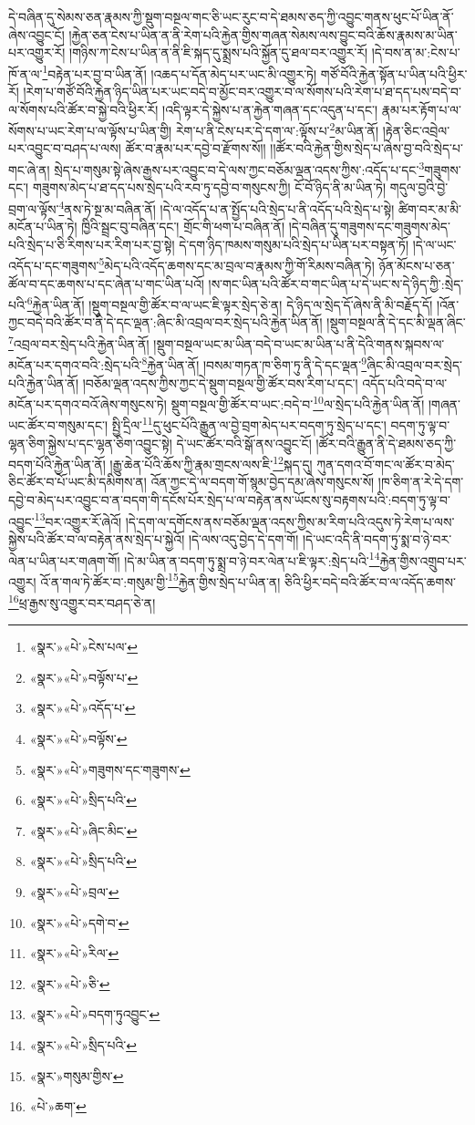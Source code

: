 དེ་བཞིན་དུ་སེམས་ཅན་རྣམས་ཀྱི་སྡུག་བསྔལ་གང་ཅི་ཡང་རུང་བ་དེ་ཐམས་ཅད་ཀྱི་འབྱུང་གནས་ཕུང་པོ་ཡིན་ནོ་ཞེས་འབྱུང་ངོ། །རྐྱེན་ཅན་ངེས་པ་ཡིན་ན་ནི་རེག་པའི་རྐྱེན་གྱིས་གཞན་སེམས་ལས་བྱུང་བའི་ཆོས་རྣམས་མ་ཡིན་པར་འགྱུར་རོ། །གཉིས་ཀ་ངེས་པ་ཡིན་ན་ནི་ཇི་སྐད་དུ་སྨྲས་པའི་སྐྱོན་དུ་ཐལ་བར་འགྱུར་རོ། །དེ་བས་ན་མ་:ངེས་པ་ཁོ་ན་ལ་\footnote{«སྣར་»«པེ་»ངེས་པལ་}བརྟེན་པར་བྱ་བ་ཡིན་ནོ། །འཆད་པ་དོན་མེད་པར་ཡང་མི་འགྱུར་ཏེ། གཙོ་བོའི་རྐྱེན་སྟོན་པ་ཡིན་པའི་ཕྱིར་རོ། །རེག་པ་གཙོ་བོའི་རྐྱེན་ཉིད་ཡིན་པར་ཡང་བདེ་བ་མྱོང་བར་འགྱུར་བ་ལ་སོགས་པའི་རེག་པ་ཐ་དད་པས་བདེ་བ་ལ་སོགས་པའི་ཚོར་བ་སྐྱེ་བའི་ཕྱིར་རོ། །འདི་ལྟར་དེ་སྐྱེས་པ་ན་རྐྱེན་གཞན་དང་འདུན་པ་དང་། རྣམ་པར་རྟོག་པ་ལ་སོགས་པ་ཡང་རེག་པ་ལ་ལྟོས་པ་ཡིན་གྱི། རེག་པ་ནི་ངེས་པར་དེ་དག་ལ་:ལྟོས་པ་\footnote{«སྣར་»«པེ་»བལྟོས་པ་}མ་ཡིན་ནོ། །རྟེན་ཅིང་འབྲེལ་པར་འབྱུང་བ་བཤད་པ་ལས། ཚོར་བ་རྣམ་པར་དབྱེ་བ་རྫོགས་སོ།། །།ཚོར་བའི་རྐྱེན་གྱིས་སྲེད་པ་ཞེས་བྱ་བའི་སྲེད་པ་གང་ཞེ་ན། སྲེད་པ་གསུམ་སྟེ་ཞེས་རྒྱས་པར་འབྱུང་བ་དེ་ལས་ཀྱང་བཅོམ་ལྡན་འདས་ཀྱིས་:འདོད་པ་དང་\footnote{«སྣར་»«པེ་»འདོད་པ་}གཟུགས་དང་། གཟུགས་མེད་པ་ཐ་དད་པས་སྲེད་པའི་རབ་ཏུ་དབྱེ་བ་གསུངས་ཀྱི། ངོ་བོ་ཉིད་ནི་མ་ཡིན་ཏེ། གདུལ་བྱའི་བྱེ་བྲག་ལ་ལྟོས་\footnote{«སྣར་»«པེ་»བལྟོས་}ནས་ཏེ་སྔ་མ་བཞིན་ནོ། །དེ་ལ་འདོད་པ་ན་སྤྱོད་པའི་སྲེད་པ་ནི་འདོད་པའི་སྲེད་པ་སྟེ། ཚིག་བར་མ་མི་མངོན་པ་ཡིན་ཏེ། ཁྱིའི་སྦྲང་བུ་བཞིན་དང་། གྲོང་གི་ཕག་པ་བཞིན་ནོ། །དེ་བཞིན་དུ་གཟུགས་དང་གཟུགས་མེད་པའི་སྲེད་པ་ཅི་རིགས་པར་རིག་པར་བྱ་སྟེ། དེ་དག་ཉིད་ཁམས་གསུམ་པའི་སྲེད་པ་ཡིན་པར་བསྟན་ཏོ། །དེ་ལ་ཡང་འདོད་པ་དང་གཟུགས་\footnote{«སྣར་»«པེ་»གཟུགས་དང་གཟུགས་}མེད་པའི་འདོད་ཆགས་དང་མ་བྲལ་བ་རྣམས་ཀྱི་གོ་རིམས་བཞིན་ཏེ། ཉོན་མོངས་པ་ཅན་ཚོལ་བ་དང་ཆགས་པ་དང་ཞེན་པ་གང་ཡིན་པའོ། །ས་གང་ཡིན་པའི་ཚོར་བ་གང་ཡིན་པ་དེ་ཡང་ས་དེ་ཉིད་ཀྱི་:སྲེད་པའི་\footnote{«སྣར་»«པེ་»སྲིད་པའི་}རྐྱེན་ཡིན་ནོ། །སྡུག་བསྔལ་གྱི་ཚོར་བ་ལ་ཡང་ཇི་ལྟར་སྲེད་ཅེ་ན། དེ་ཉིད་ལ་སྲེད་དོ་ཞེས་ནི་མི་བརྗོད་དོ། །འོན་ཀྱང་བདེ་བའི་ཚོར་བ་ནི་དེ་དང་ལྡན་:ཞིང་མི་འབྲལ་བར་སྲེད་པའི་རྐྱེན་ཡིན་ནོ། །སྡུག་བསྔལ་ནི་དེ་དང་མི་ལྡན་ཞིང་\footnote{«སྣར་»«པེ་»ཞིང་མིང་}འབྲལ་བར་སྲེད་པའི་རྐྱེན་ཡིན་ནོ། །སྡུག་བསྔལ་ཡང་མ་ཡིན་བདེ་བ་ཡང་མ་ཡིན་པ་ནི་དེའི་གནས་སྐབས་ལ་མངོན་པར་དགའ་བའི་:སྲེད་པའི་\footnote{«སྣར་»«པེ་»སྲིད་པའི་}རྐྱེན་ཡིན་ནོ། །བསམ་གཏན་ཁ་ཅིག་ཏུ་ནི་དེ་དང་ལྡན་\footnote{«སྣར་»«པེ་»བྲལ་}ཞིང་མི་འབྲལ་བར་སྲེད་པའི་རྐྱེན་ཡིན་ནོ། །བཅོམ་ལྡན་འདས་ཀྱིས་ཀྱང་དེ་སྡུག་བསྔལ་གྱི་ཚོར་བས་རིག་པ་དང་། འདོད་པའི་བདེ་བ་ལ་མངོན་པར་དགའ་བའོ་ཞེས་གསུངས་ཏེ། སྡུག་བསྔལ་གྱི་ཚོར་བ་ཡང་:བདེ་བ་\footnote{«སྣར་»«པེ་»དགེ་བ་}ལ་སྲེད་པའི་རྐྱེན་ཡིན་ནོ། །གཞན་ཡང་ཚོར་བ་གསུམ་དང་། སྤྱི་དྲིལ་\footnote{«སྣར་»«པེ་»རིལ་}དུ་ཕུང་པོའི་རྒྱུན་ལ་བྱེ་བྲག་མེད་པར་བདག་ཏུ་སྲེད་པ་དང་། བདག་ཏུ་ལྟ་བ་ལྷན་ཅིག་སྐྱེས་པ་དང་ལྷན་ཅིག་འབྱུང་སྟེ། དེ་ཡང་ཚོར་བའི་སྒོ་ནས་འབྱུང་ངོ། །ཚོར་བའི་རྒྱུན་ནི་དེ་ཐམས་ཅད་ཀྱི་བདག་པོའི་རྐྱེན་ཡིན་ནོ། །རྒྱུ་ཆེན་པོའི་ཆོས་ཀྱི་རྣམ་གྲངས་ལས་ཇི་\footnote{«སྣར་»«པེ་»ཅི་}སྐད་དུ། ཀུན་དགའ་བོ་གང་ལ་ཚོར་བ་མེད་ཅིང་ཚོར་བ་པོ་ཡང་མི་དམིགས་ན། འོན་ཀྱང་དེ་ལ་བདག་གོ་སྙམ་བྱེད་དམ་ཞེས་གསུངས་སོ། །ཁ་ཅིག་ན་རེ་དེ་དག་དབྱེ་བ་མེད་པར་འབྱུང་བ་ན་བདག་གི་དངོས་པོར་སྲེད་པ་ལ་བརྟེན་ནས་ཡོངས་སུ་བརྟགས་པའི་:བདག་ཏུ་ལྟ་བ་འབྱུང་\footnote{«སྣར་»«པེ་»བདག་ཏུའབྱུང་}བར་འགྱུར་རོ་ཞེའོ། །དེ་དག་ལ་དགོངས་ནས་བཅོམ་ལྡན་འདས་ཀྱིས་མ་རིག་པའི་འདུས་ཏེ་རེག་པ་ལས་སྐྱེས་པའི་ཚོར་བ་ལ་བརྟེན་ནས་སྲེད་པ་སྐྱེའོ། །དེ་ལས་འདུ་བྱེད་དེ་དག་གོ། །དེ་ཡང་འདི་ནི་བདག་ཏུ་སྨ་བ་ཉེ་བར་ལེན་པ་ཡིན་པར་གཞག་གོ། །དེ་མ་ཡིན་ན་བདག་ཏུ་སྨྲ་བ་ཉེ་བར་ལེན་པ་ཇི་ལྟར་:སྲེད་པའི་\footnote{«སྣར་»«པེ་»སྲིད་པའི་}རྐྱེན་གྱིས་འགྲུབ་པར་འགྱུར། འོ་ན་གལ་ཏེ་ཚོར་བ་:གསུམ་གྱི་\footnote{«སྣར་»གསུམ་གྱིས་}རྐྱེན་གྱིས་སྲེད་པ་ཡིན་ན། ཅིའི་ཕྱིར་བདེ་བའི་ཚོར་བ་ལ་འདོད་ཆགས་\footnote{«པེ་»ཆག་}ཕྲ་རྒྱས་སུ་འགྱུར་བར་བཤད་ཅེ་ན། 
